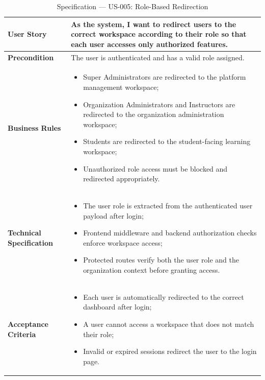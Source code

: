 \begin{table}[H]
\centering
\caption{Specification — US-005: Role-Based Redirection}
\label{tab:us005}
\renewcommand{\arraystretch}{1}
\begin{tabularx}{\textwidth}{|p{2.5cm}|X|}
\hline
\textbf{User Story} & As the system, I want to redirect users to the correct workspace according to their role so that each user accesses only authorized features. \\
\hline
\textbf{Precondition} & The user is authenticated and has a valid role assigned. \\
\hline
\textbf{Business Rules} &
\begin{itemize}
  \item Super Administrators are redirected to the platform management workspace;
  \item Organization Administrators and Instructors are redirected to the organization administration workspace;
  \item Students are redirected to the student-facing learning workspace;
  \item Unauthorized role access must be blocked and redirected appropriately.
\end{itemize} \\
\hline
\textbf{Technical Specification} &
\begin{itemize}
  \item The user role is extracted from the authenticated user payload after login;
  \item Frontend middleware and backend authorization checks enforce workspace access;
  \item Protected routes verify both the user role and the organization context before granting access.
\end{itemize} \\
\hline
\textbf{Acceptance Criteria} &
\begin{itemize}
  \item Each user is automatically redirected to the correct dashboard after login;
  \item A user cannot access a workspace that does not match their role;
  \item Invalid or expired sessions redirect the user to the login page.
\end{itemize} \\
\hline
\end{tabularx}
\end{table}

